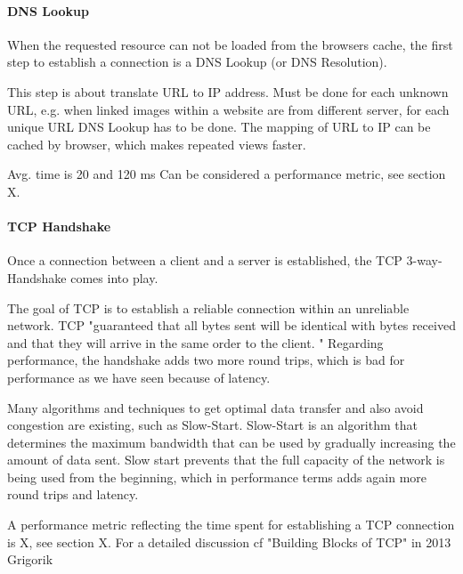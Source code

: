 

\paragraph{DNS Lookup}

When the requested resource can not be loaded from the browsers cache, the first step to establish a connection is a DNS Lookup (or DNS Resolution).

This step is about translate URL to IP address.
Must be done for each unknown URL, e.g. when linked images within a website are from different server, for each unique URL DNS Lookup has to be done.
The mapping of URL to IP can be cached by browser, which makes repeated views faster. %

Avg. time is 20 and 120 ms %
Can be considered a performance metric, see section X.




\paragraph{TCP Handshake}

Once a connection between a client and a server is established, the TCP 3-way-Handshake comes into play.

The goal of TCP is to establish a reliable connection within an unreliable network.
TCP  "guaranteed that all bytes sent will be identical with bytes received and that they will arrive in the same order to the client. " %
Regarding performance, the handshake adds two more round trips, which is bad for performance as we have seen because of latency.

Many algorithms and techniques to get optimal data transfer and also avoid congestion are existing, such as Slow-Start.
Slow-Start is an algorithm that determines the maximum bandwidth that can be used by gradually increasing the amount of data sent.
Slow start prevents that the full capacity of the network is being used from the beginning, which in performance terms adds again more round trips and latency. %


A performance metric reflecting the time spent for establishing a TCP connection is X, see section X.
For a detailed discussion cf "Building Blocks of TCP" in 2013 Grigorik %


